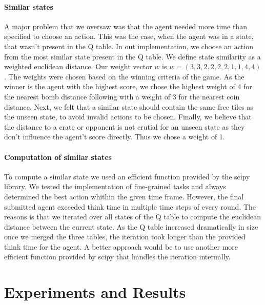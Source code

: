 \documentclass[
	letterpaper, %
	10pt, %
]{CSUniSchoolLabReport}
\begin{document}
\paragraph*{Similar states}
A major problem that we oversaw was that the agent needed more time than specified to choose an action.
This was the case, when the agent was in a state, that wasn't present in the Q table. In out implementation, we
choose an action from the most similar state present in the Q table. We define state similarity as a weighted euclidean
distance. Our weight vector $w$ is $ w= (3, 3, 2, 2, 2, 2, 1, 1, 4, 4)$. The weights were
chosen based on the winning criteria of the game. As the winner is the agent with the highest score,
we chose the highest weight of 4 for the nearest bomb distance following with a weight of 3 for the nearest coin distance.
Next, we felt that a similar state should contain the same free tiles as the unseen state, to avoid invalid actions to be chosen.
Finally, we believe that the distance to a crate or opponent is not crutial for an unseen state as they don't influence the agent't score directly.
Thus we chose a weight of 1.

\paragraph*{Computation of similar states}
To compute a similar state we used an efficient function provided by the scipy library. We
tested the implementation of fine-grained tasks and always determined the best action
whithin the given time frame. However, the final submitted agent exceeded think time in multiple time steps of every round.
The reasons is that we iterated over all states of the Q table to compute the euclidean distance between
the current state. As the Q table increased dramatically in size once we merged the three tables, the iteration took longer than the provided
think time for the agent. A better approach would be to use another more efficient function provided by scipy
that handles the iteration internally.





\section{Experiments and Results}
\end{document}

